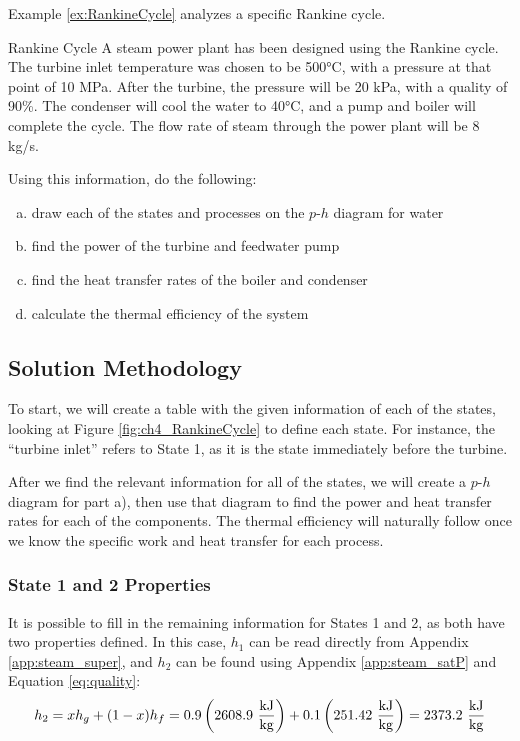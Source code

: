 Example \ref{ex:RankineCycle} analyzes a specific Rankine cycle.

\begin{example}[label=ex:RankineCycle]{Rankine Cycle}
  A steam power plant has been designed using the Rankine cycle.  The turbine inlet temperature was chosen to be 500°C, with a pressure at that point of 10 MPa.  After the turbine, the pressure will be 20 kPa, with a quality of 90\%.  The condenser will cool the water to 40°C, and a pump and boiler will complete the cycle.  The flow rate of steam through the power plant will be 8 kg/s.

  Using this information, do the following:
  \begin{enumerate}[a)]
  \item draw each of the states and processes on the $p$-$h$ diagram for water
  \item find the power of the turbine and feedwater pump
  \item find the heat transfer rates of the boiler and condenser
  \item calculate the thermal efficiency of the system
  \end{enumerate}

  \subsection*{Solution Methodology}
  To start, we will create a table with the given information of each of the states, looking at Figure \ref{fig:ch4_RankineCycle} to define each state.  For instance, the ``turbine inlet'' refers to State 1, as it is the state immediately before the turbine.

  After we find the relevant information for all of the states, we will create a $p$-$h$ diagram for part a), then use that diagram to find the power and heat transfer rates for each of the components.  The thermal efficiency will naturally follow once we know the specific work and heat transfer for each process.

  \subsubsection{State 1 and 2 Properties}
  It is possible to fill in the remaining information for States 1 and 2, as both have two properties defined.  In this case, $h_1$ can be read directly from Appendix \ref{app:steam_super}, and $h_2$ can be found using Appendix \ref{app:steam_satP} and Equation \ref{eq:quality}:
  \begin{equation*}
    h_2 = x h_g + (1-x) h_f = 0.9 \left(2608.9\  \frac{\rm kJ}{\rm kg}\right) + 0.1 \left(251.42\ \frac{\rm kJ}{\rm kg}\right) = 2373.2\ \frac{\rm kJ}{\rm kg}
  \end{equation*}


\end{example}

